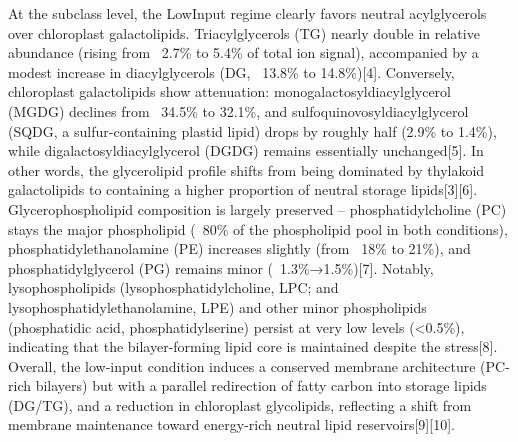 \documentclass[10pt,letterpaper]{article}
\begin{document}
At the subclass level, the LowInput regime clearly favors neutral acylglycerols over chloroplast galactolipids. Triacylglycerols (TG) nearly double in relative abundance (rising from ~2.7\% to 5.4\% of total ion signal), accompanied by a modest increase in diacylglycerols (DG, ~13.8\% to 14.8\%)[4]. Conversely, chloroplast galactolipids show attenuation: monogalactosyldiacylglycerol (MGDG) declines from ~34.5\% to 32.1\%, and sulfoquinovosyldiacylglycerol (SQDG, a sulfur-containing plastid lipid) drops by roughly half (2.9\% to 1.4\%), while digalactosyldiacylglycerol (DGDG) remains essentially unchanged[5]. In other words, the glycerolipid profile shifts from being dominated by thylakoid galactolipids to containing a higher proportion of neutral storage lipids[3][6]. Glycerophospholipid composition is largely preserved – phosphatidylcholine (PC) stays the major phospholipid (~80\% of the phospholipid pool in both conditions), phosphatidylethanolamine (PE) increases slightly (from ~18\% to 21\%), and phosphatidylglycerol (PG) remains minor (~1.3\%→1.5\%)[7]. Notably, lysophospholipids (lysophosphatidylcholine, LPC; and lysophosphatidylethanolamine, LPE) and other minor phospholipids (phosphatidic acid, phosphatidylserine) persist at very low levels (<0.5\%), indicating that the bilayer-forming lipid core is maintained despite the stress[8]. Overall, the low-input condition induces a conserved membrane architecture (PC-rich bilayers) but with a parallel redirection of fatty carbon into storage lipids (DG/TG), and a reduction in chloroplast glycolipids, reflecting a shift from membrane maintenance toward energy-rich neutral lipid reservoirs[9][10].
\end{document}
